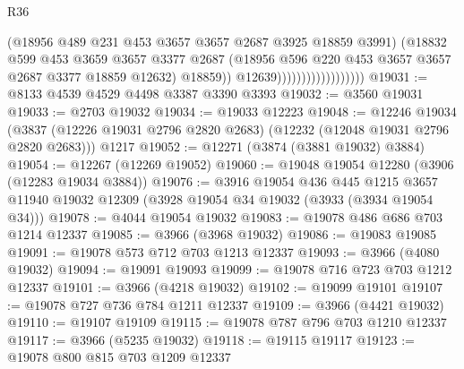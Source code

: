 \begin{lexlean}{R36}
\begin{coremodule}
                                          (@18956
                                            @489
                                            @231
                                            @453
                                            @3657
                                            @3657
                                            @2687
                                            @3925
                                            @18859
                                            @3991)
                                          (@18832
                                            @599
                                            @453
                                            @3659
                                            @3657
                                            @3377
                                            @2687
                                            (@18956
                                              @596
                                              @220
                                              @453
                                              @3657
                                              @3657
                                              @2687
                                              @3377
                                              @18859
                                              @12632)
                                            @18859))
                                        @12639))))))))))))))))))
@19031 := @8133 @4539 @4529 @4498 @3387 @3390 @3393
@19032 := @3560 @19031
@19033 := @2703 @19032
@19034 := @19033 @12223
@19048 := @12246
    @19034
    (@3837 (@12226 @19031 @2796 @2820 @2683) (@12232 (@12048 @19031 @2796 @2820 @2683)))
    @1217
@19052 := @12271 (@3874 (@3881 @19032) @3884)
@19054 := @12267 (@12269 @19052)
@19060 := @19048 @19054 @12280 (@3906 (@12283 @19034 @3884))
@19076 := @3916
    @19054
    @436
    @445
    @1215
    @3657
    @11940
    @19032
    @12309
    (@3928 @19054 @34 @19032 (@3933 (@3934 @19054 @34)))
@19078 := @4044 @19054 @19032
@19083 := @19078 @486 @686 @703 @1214 @12337
@19085 := @3966 (@3968 @19032)
@19086 := @19083 @19085
@19091 := @19078 @573 @712 @703 @1213 @12337
@19093 := @3966 (@4080 @19032)
@19094 := @19091 @19093
@19099 := @19078 @716 @723 @703 @1212 @12337
@19101 := @3966 (@4218 @19032)
@19102 := @19099 @19101
@19107 := @19078 @727 @736 @784 @1211 @12337
@19109 := @3966 (@4421 @19032)
@19110 := @19107 @19109
@19115 := @19078 @787 @796 @703 @1210 @12337
@19117 := @3966 (@5235 @19032)
@19118 := @19115 @19117
@19123 := @19078 @800 @815 @703 @1209 @12337

\end{coremodule}
\end{lexlean}
